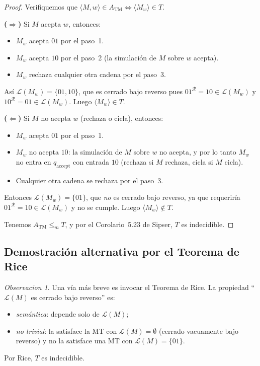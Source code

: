 \documentclass[11pt,a4paper]{article}
\theoremstyle{plain}
\theoremstyle{definition}
\theoremstyle{remark}
\newtheorem*{observacion}{Observacion}
\newcommand{\TM}{\mathrm{TM}}
\newcommand{\enc}[1]{\langle #1\rangle}
\newcommand{\encMw}{\langle M, w\rangle}
\newcommand{\lang}{\mathcal{L}}
\newcommand{\redm}{\le_{m}}
\newcommand{\qaccept}{q_{\text{accept}}}
\newcommand{\ATM}{A_{\TM}}
\begin{document}
\begin{proof}
Verifiquemos que $\encMw \in \ATM \iff \enc{M_w}\in T$.

\textbf{($\Rightarrow$)} Si $M$ acepta $w$, entonces:
\begin{itemize}
  \item $M_w$ acepta $01$ por el paso~1.
  \item $M_w$ acepta $10$ por el paso~2 (la simulaci\'on de $M$ sobre $w$ acepta).
  \item $M_w$ rechaza cualquier otra cadena por el paso~3.
\end{itemize}
As\'i $\lang(M_w) = \{01,10\}$, que es cerrado bajo reverso pues
$01^{\mathcal R}=10\in\lang(M_w)$ y $10^{\mathcal R}=01\in\lang(M_w)$. Luego
$\enc{M_w}\in T$.

\textbf{($\Leftarrow$)} Si $M$ no acepta $w$ (rechaza o cicla), entonces:
\begin{itemize}
  \item $M_w$ acepta $01$ por el paso~1.
  \item $M_w$ no acepta $10$: la simulaci\'on de $M$ sobre $w$ no acepta,
        y por lo tanto $M_w$ no entra en $\qaccept$ con entrada $10$
        (rechaza si $M$ rechaza, cicla si $M$ cicla).
  \item Cualquier otra cadena se rechaza por el paso~3.
\end{itemize}
Entonces $\lang(M_w)=\{01\}$, que \emph{no} es cerrado bajo reverso, ya
que requerir\'ia $01^{\mathcal R}=10\in\lang(M_w)$ y no se cumple. Luego
$\enc{M_w}\notin T$.

Tenemos $\ATM \redm T$, y por el Corolario~5.23 de Sipser, $T$ es
indecidible.
\end{proof}

\subsection*{Demostraci\'on alternativa por el Teorema de Rice}

\begin{observacion}
Una v\'ia m\'as breve es invocar el Teorema de Rice. La propiedad
``$\lang(M)$ es cerrado bajo reverso'' es:
\begin{itemize}
  \item \emph{sem\'antica}: depende solo de $\lang(M)$;
  \item \emph{no trivial}: la satisface la MT con $\lang(M)=\emptyset$
        (cerrado vacuamente bajo reverso) y no la satisface una MT con
        $\lang(M)=\{01\}$.
\end{itemize}
Por Rice, $T$ es indecidible.
\end{observacion}
\end{document}
